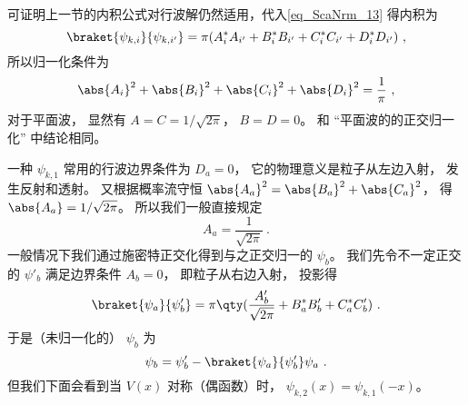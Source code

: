 可证明上一节的内积公式对行波解仍然适用，代入\autoref{eq_ScaNrm_13} 得内积为
\begin{equation}
\braket{\psi_{k,i}}{\psi_{k,i'}} = \pi (A_i^* A_{i'} + B_i^* B_{i'} + C_i^* C_{i'} + D_i^* D_{i'})~,
\end{equation}
所以归一化条件为
\begin{equation}
\abs{A_i}^2 + \abs{B_i}^2 + \abs{C_i}^2 + \abs{D_i}^2= \frac{1}{\pi}~,
\end{equation}
对于平面波， 显然有 $A = C = 1/\sqrt{2\pi}$， $B = D = 0$。 和 “平面波的的正交归一化” 中结论相同。

一种 $\psi_{k,1}$ 常用的行波边界条件为 $D_a = 0$， 它的物理意义是粒子从左边入射， 发生反射和透射。 又根据概率流守恒 $\abs{A_a}^2 = \abs{B_a}^2 + \abs{C_a}^2$， 得 $\abs{A_a} = 1/\sqrt{2\pi}$。 所以我们一般直接规定
\begin{equation}\label{eq_ScaNrm_10}
A_a = \frac{1}{\sqrt{2\pi}}~.
\end{equation}
一般情况下我们通过施密特正交化得到与之正交归一的 $\psi_b$。 我们先令不一定正交的 $\psi'_b$ 满足边界条件 $A_b = 0$， 即粒子从右边入射， 投影得
\begin{equation}
\braket{\psi_a}{\psi'_b} = \pi \qty(\frac{A'_b}{\sqrt{2\pi}} + B_a^* B'_b + C_a^*C'_b)~.
\end{equation}
于是（未归一化的） $\psi_b$ 为
\begin{equation}
\psi_b = \psi'_b - \braket{\psi_a}{\psi'_b}\psi_a~.
\end{equation}
但我们下面会看到当 $V(x)$ 对称（偶函数）时， $\psi_{k,2}(x) = \psi_{k,1}(-x)$。

